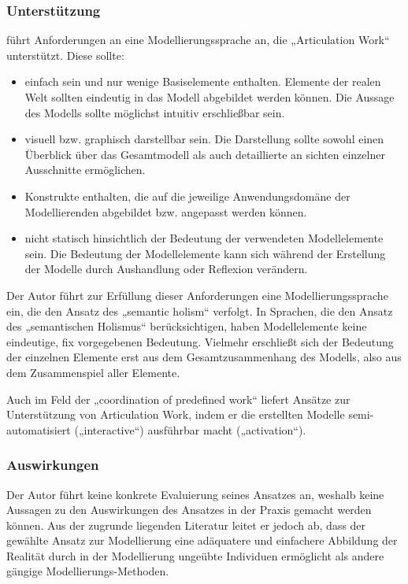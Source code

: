 \subsubsection{Unterstützung}

\citeauthor{Jorgensen04} führt Anforderungen an eine Modellierungssprache an, die „Articulation Work“ unterstützt. \label{steps:jorgensen} Diese sollte:
\begin{itemize}
	\item einfach sein und nur wenige Basiselemente enthalten. Elemente der realen Welt sollten eindeutig in das Modell abgebildet werden können. Die Aussage des Modells sollte möglichst intuitiv erschließbar sein.
	\item visuell bzw. graphisch darstellbar sein. Die Darstellung sollte sowohl einen Überblick über das Gesamtmodell als auch detaillierte an sichten einzelner Ausschnitte ermöglichen.
	\item Konstrukte enthalten, die auf die jeweilige Anwendungsdomäne der Modellierenden abgebildet bzw. angepasst werden können.
	\item nicht statisch hinsichtlich der Bedeutung der verwendeten Modellelemente sein. Die Bedeutung der Modellelemente kann sich während der Erstellung der Modelle durch Aushandlung oder Reflexion verändern.
\end{itemize}

Der Autor führt zur Erfüllung dieser Anforderungen eine Modellierungssprache ein, die den Ansatz des „semantic holism“ verfolgt. In Sprachen, die den Ansatz des „semantischen Holismus“ berücksichtigen, haben Modellelemente keine eindeutige, fix vorgegebenen Bedeutung. Vielmehr erschließt sich der Bedeutung der einzelnen Elemente erst aus dem Gesamtzusammenhang des Modells, also aus dem Zusammenspiel aller Elemente.

Auch im Feld der „coordination of predefined work“ liefert \citet{Jorgensen04} Ansätze zur Unterstützung von Articulation Work, indem er die erstellten Modelle semi-automatisiert („interactive“) ausführbar macht („activation“).

\subsubsection{Auswirkungen}

Der Autor führt keine konkrete Evaluierung seines Ansatzes an, weshalb keine Aussagen zu den Auswirkungen des Ansatzes in der Praxis gemacht werden können. Aus der zugrunde liegenden Literatur leitet er jedoch ab, dass der gewählte Ansatz zur Modellierung eine adäquatere und einfachere Abbildung der Realität durch in der Modellierung ungeübte Individuen ermöglicht als andere gängige Modellierungs-Methoden.

